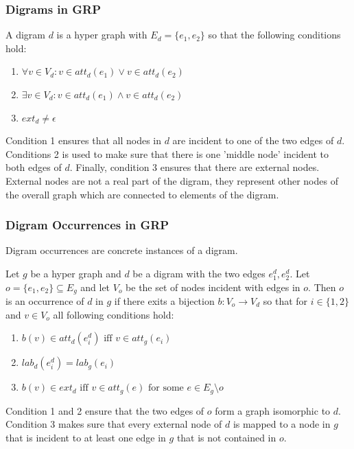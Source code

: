 \subsubsection{Digrams in GRP}

A digram $d$ is a hyper graph with $E_d=\{e_1,e_2\}$ so that the following conditions hold:

\begin{enumerate}
	\item $\forall v \in V_d : v\in att_d(e_1) \vee v \in att_d(e_2)$
	\item $\exists v\in V_d : v\in att_d(e_1) \wedge v\in att_d(e_2)$
	\item $ext_d \not= \epsilon$
\end{enumerate}

Condition 1 ensures that all nodes in $d$ are incident to one of the two edges of $d$. Conditions 2 is used to make sure that there is one 'middle node' incident to both edges of $d$. Finally, condition 3 ensures that there are external nodes. External nodes are not a real part of the digram, they represent other nodes of the overall graph which are connected to elements of the digram.~\cite{maneth}


\subsubsection{Digram Occurrences in GRP}

Digram occurrences are concrete instances of a digram.

Let $g$ be a hyper graph and $d$ be a digram with the two edges $e_1^d,e_2^d$. Let $o=\{e_1,e_2\} \subseteq E_g$ and let $V_o$ be the set of nodes incident with edges in $o$. Then $o$ is an occurrence of $d$ in $g$ if there exits a bijection $b:V_o \to V_d$ so that for $i\in \{1,2\} $ and $v\in V_o$ all following conditions hold:

\begin{enumerate}
	\item $b(v)\in att_d(e_i^d) \text{ iff } v\in att_g(e_i)$
	\item $lab_d(e_i^d)=lab_g(e_i)$
	\item $b(v)\in ext_d \text{ iff } v\in att_g(e) \text{ for some } e\in E_g \setminus o$
\end{enumerate}

Condition 1 and 2 ensure that the two edges of $o$ form a graph isomorphic to $d$. Condition 3 makes sure that every external node of $d$ is mapped to a node in $g$ that is incident to at least one edge in $g$ that is not contained in $o$.~\cite{maneth}

